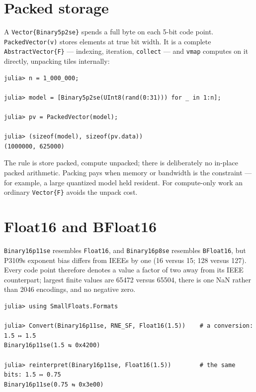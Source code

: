 \section{Packed storage}



\label{8567984038512272605}{}


A \texttt{Vector\{Binary5p2se\}} spends a full byte on each 5-bit code point. \texttt{PackedVector(v)} stores elements at true bit width. It is a complete \texttt{AbstractVector\{F\}} — indexing, iteration, \texttt{collect} — and \texttt{vmap} computes on it directly, unpacking tiles internally:




\begin{verbatim}
julia> n = 1_000_000;

julia> model = [Binary5p2se(UInt8(rand(0:31))) for _ in 1:n];

julia> pv = PackedVector(model);

julia> (sizeof(model), sizeof(pv.data))
(1000000, 625000)
\end{verbatim}



The rule is store packed, compute unpacked; there is deliberately no in-place packed arithmetic. Packing pays when memory or bandwidth is the constraint — for example, a large quantized model held resident. For compute-only work an ordinary \texttt{Vector\{F\}} avoids the unpack cost.



\section{Float16 and BFloat16}



\label{10938659776745642755}{}


\texttt{Binary16p11se} resembles \texttt{Float16}, and \texttt{Binary16p8se} resembles \texttt{BFloat16}, but P3109{\textquotesingle}s exponent bias differs from IEEE{\textquotesingle}s by one (16 versus 15; 128 versus 127). Every code point therefore denotes a value a factor of two away from its IEEE counterpart; largest finite values are 65472 versus 65504, there is one NaN rather than 2046 encodings, and no negative zero.




\begin{verbatim}
julia> using SmallFloats.Formats

julia> Convert(Binary16p11se, RNE_SF, Float16(1.5))    # a conversion: 1.5 ↦ 1.5
Binary16p11se(1.5 ⇆ 0x4200)

julia> reinterpret(Binary16p11se, Float16(1.5))        # the same bits: 1.5 ↦ 0.75
Binary16p11se(0.75 ⇆ 0x3e00)
\end{verbatim}



